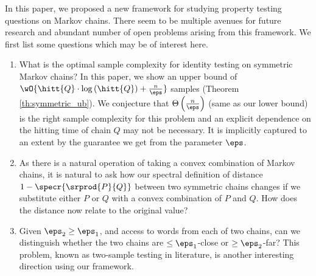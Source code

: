 In this paper, we proposed a new framework for studying property testing questions on Markov chains. 
There seem to be multiple avenues for future research and abundant number of open problems arising from this framework. 
We first list some questions which may be of interest here.
\begin{enumerate}
\item What is the optimal sample complexity for identity testing on symmetric Markov chains? In this paper, we show an upper bound of $\wO{\hitt{Q}\cdot\log\left(\hitt{Q}\right)+\frac{n}{\eps}}$ samples (Theorem \ref{th:symmetric_ub}). We conjecture that $\Theta\left( \frac{n}{\eps}\right)$ (same as our lower bound) is the right sample complexity for this problem and an explicit dependence on the hitting time of chain $Q$ may not be necessary. It is implicitly captured to an extent by the guarantee we get from the parameter $\eps$.

\item As there is a natural operation of taking a convex combination of Markov chains, it is natural to ask how our spectral definition of distance 
$1-\specr{\srprod{P}{Q}}$ between two symmetric chains changes if we substitute either $P$ or $Q$ with a convex combination of $P$ and $Q$. How does the distance now relate to the original value?
\item Given $\eps_2 \ge \eps_1$, and access to words from each of two chains, can we distinguish whether the two chains are $\le \eps_1$-close or $\ge \eps_2$-far? This problem, known as two-sample testing in literature, is another interesting direction using our framework.
\end{enumerate}


